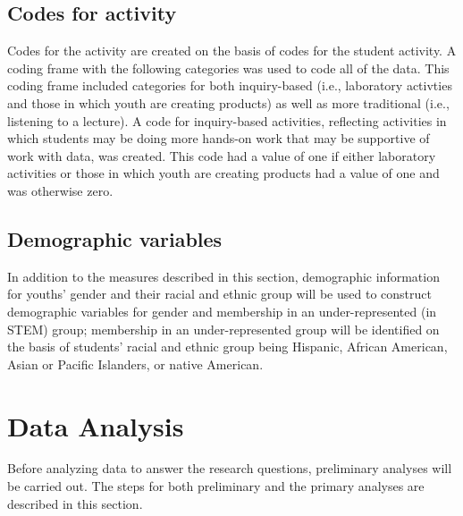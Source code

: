 \documentclass[]{book}
\theoremstyle{definition}
\theoremstyle{definition}
\theoremstyle{definition}
\theoremstyle{remark}
\begin{document}
\subsection{Codes for activity}\label{codes-for-activity}

Codes for the activity are created on the basis of codes for the student
activity. A coding frame with the following categories was used to code
all of the data. This coding frame included categories for both
inquiry-based (i.e., laboratory activties and those in which youth are
creating products) as well as more traditional (i.e., listening to a
lecture). A code for inquiry-based activities, reflecting activities in
which students may be doing more hands-on work that may be supportive of
work with data, was created. This code had a value of one if either
laboratory activities or those in which youth are creating products had
a value of one and was otherwise zero.

\subsection{Demographic variables}\label{demographic-variables}

In addition to the measures described in this section, demographic
information for youths' gender and their racial and ethnic group will be
used to construct demographic variables for gender and membership in an
under-represented (in STEM) group; membership in an under-represented
group will be identified on the basis of students' racial and ethnic
group being Hispanic, African American, Asian or Pacific Islanders, or
native American.

\section{Data Analysis}\label{data-analysis}

Before analyzing data to answer the research questions, preliminary
analyses will be carried out. The steps for both preliminary and the
primary analyses are described in this section.
\end{document}
